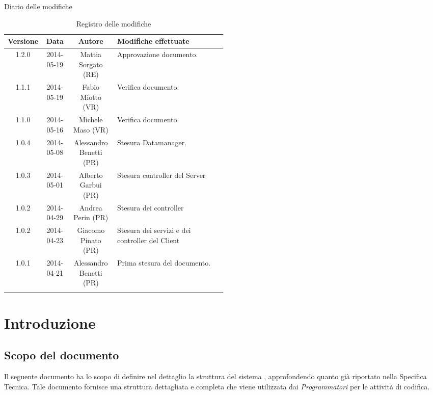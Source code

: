 
\newpage
Diario delle modifiche
\begin{center}
\begin{longtable}{|c|c|c|p{0.5\linewidth}|}
\toprule
\textbf{Versione} & \textbf{Data} & \textbf{Autore} & \textbf{Modifiche effettuate}\\

\midrule
1.2.0 & 2014-05-19 & Mattia Sorgato (RE) & Approvazione documento.\\
\midrule
1.1.1 & 2014-05-19 & Fabio Miotto (VR) & Verifica documento.\\
\midrule
1.1.0 & 2014-05-16 & Michele Maso (VR) & Verifica documento.\\
\midrule

1.0.4 & 2014-05-08 & Alessandro Benetti (PR) & Stesura Datamanager.\\
\midrule
1.0.3 & 2014-05-01 & Alberto Garbui (PR) & Stesura controller del Server\\
\midrule
1.0.2 & 2014-04-29 & Andrea Perin (PR) & Stesura dei controller\\
\midrule
1.0.2 & 2014-04-23 & Giacomo Pinato (PR) & Stesura dei servizi e dei controller del Client\\
\midrule
1.0.1 & 2014-04-21 & Alessandro Benetti (PR) & Prima stesura del documento.\\

\bottomrule
\caption{Registro delle modifiche}
\label{tab:changelog}

\end{longtable}
\end{center}

\newpage
\tableofcontents

\newpage
\listoffigures %

\newpage
\section{Introduzione}
\subsection{Scopo del documento}
Il seguente documento ha lo scopo di definire nel dettaglio la struttura del sistema , approfondendo quanto già riportato nella Specifica Tecnica. Tale documento fornisce una struttura dettagliata e completa che viene utilizzata dai \emph{Programmatori} per le attività di codifica. 

